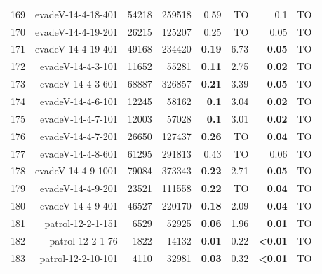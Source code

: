 \begin{longtable}{lrr@{\hskip 12pt}r@{\hskip 12pt}r@{\hskip 12pt}r@{\hskip 12pt}r@{\hskip 12pt}r}
169 & \multirow{1}{*}{evadeV-14-4-18-401} & \multirow{1}{*}{54218} & \multirow{1}{*}{259518} & 0.59 & TO & 0.1 & TO \\
170 & \multirow{1}{*}{evadeV-14-4-19-201} & \multirow{1}{*}{26215} & \multirow{1}{*}{125207} & 0.25 & TO & 0.05 & TO \\
171 & \multirow{1}{*}{evadeV-14-4-19-401} & \multirow{1}{*}{49168} & \multirow{1}{*}{234420} & \textbf{0.19} & 6.73 & \textbf{0.05} & TO \\
172 & \multirow{1}{*}{evadeV-14-4-3-101} & \multirow{1}{*}{11652} & \multirow{1}{*}{55281} & \textbf{0.11} & 2.75 & \textbf{0.02} & TO \\
173 & \multirow{1}{*}{evadeV-14-4-3-601} & \multirow{1}{*}{68887} & \multirow{1}{*}{326857} & \textbf{0.21} & 3.39 & \textbf{0.05} & TO \\
174 & \multirow{1}{*}{evadeV-14-4-6-101} & \multirow{1}{*}{12245} & \multirow{1}{*}{58162} & \textbf{0.1} & 3.04 & \textbf{0.02} & TO \\
175 & \multirow{1}{*}{evadeV-14-4-7-101} & \multirow{1}{*}{12003} & \multirow{1}{*}{57028} & \textbf{0.1} & 3.01 & \textbf{0.02} & TO \\
176 & \multirow{1}{*}{evadeV-14-4-7-201} & \multirow{1}{*}{26650} & \multirow{1}{*}{127437} & \textbf{0.26} & TO & \textbf{0.04} & TO \\
177 & \multirow{1}{*}{evadeV-14-4-8-601} & \multirow{1}{*}{61295} & \multirow{1}{*}{291813} & 0.43 & TO & 0.06 & TO \\
178 & \multirow{1}{*}{evadeV-14-4-9-1001} & \multirow{1}{*}{79084} & \multirow{1}{*}{373343} & \textbf{0.22} & 2.71 & \textbf{0.05} & TO \\
179 & \multirow{1}{*}{evadeV-14-4-9-201} & \multirow{1}{*}{23521} & \multirow{1}{*}{111558} & \textbf{0.22} & TO & \textbf{0.04} & TO \\
180 & \multirow{1}{*}{evadeV-14-4-9-401} & \multirow{1}{*}{46527} & \multirow{1}{*}{220170} & \textbf{0.18} & 2.09 & \textbf{0.04} & TO \\
181 & \multirow{1}{*}{patrol-12-2-1-151} & \multirow{1}{*}{6529} & \multirow{1}{*}{52925} & \textbf{0.06} & 1.96 & \textbf{0.01} & TO \\
182 & \multirow{1}{*}{patrol-12-2-1-76} & \multirow{1}{*}{1822} & \multirow{1}{*}{14132} & \textbf{0.01} & 0.22 & \textbf{<0.01} & TO \\
183 & \multirow{1}{*}{patrol-12-2-10-101} & \multirow{1}{*}{4110} & \multirow{1}{*}{32981} & \textbf{0.03} & 0.32 & \textbf{<0.01} & TO \\

\end{longtable}
